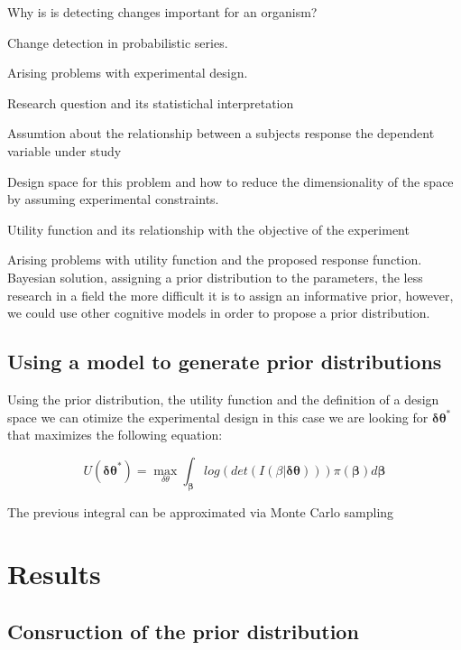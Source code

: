 \documentclass[preprint,review,12pt]{elsarticle}
\begin{document}
Why is is detecting changes important for an organism?

Change detection in probabilistic series.

Arising problems with experimental design.

Research question and its statistichal interpretation

Assumtion about the relationship between a subjects response the dependent variable under study

Design space for this problem and how to reduce the dimensionality of the space by assuming experimental constraints.

Utility function and its relationship with the objective of the experiment

Arising problems with utility function and the proposed response function. Bayesian solution, assigning a prior distribution to the parameters, the less research in a field the more difficult it is to assign an informative prior, however, we could use other cognitive models in order to propose a prior distribution. 
\subsection{Using a model to generate prior distributions}

Using the prior distribution, the utility function and the definition of a design space we can otimize the experimental design in this case we are looking for \begin{math}\mathbf{\delta\theta}^{*}\end{math} that maximizes the following equation:

\begin{equation}
U(\mathbf{\delta\theta}^{*})=\max_{\delta\theta} \int_{\mathbf{\beta}} log(det(I(\beta|\mathbf{\delta\theta}))) \pi(\mathbf{\beta}) d\mathbf{\beta}
\end{equation}

The previous integral can be approximated via Monte Carlo sampling

\section{Results}
\label{S:3}

\subsection{Consruction of the prior distribution}
\end{document}
